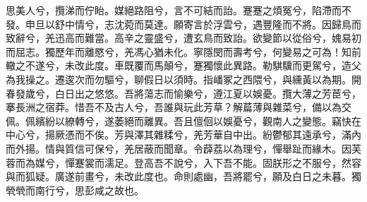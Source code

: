 
\begin{pinyinscope}
思美人兮，攬涕而佇眙。媒絕路阻兮，言不可結而詒。蹇蹇之煩冤兮，陷滯而不發。申旦以舒中情兮，志沈菀而莫達。願寄言於浮雲兮，遇豐隆而不將。因歸鳥而致辭兮，羌迅高而難當。高辛之靈盛兮，遭玄鳥而致詒。欲變節以從俗兮，媿易初而屈志。獨歷年而離愍兮，羌馮心猶未化。寧隱閔而壽考兮，何變易之可為！知前轍之不遂兮，未改此度。車既覆而馬顛兮，蹇獨懷此異路。勒騏驥而更駕兮，造父為我操之。遷逡次而勿驅兮，聊假日以須時。指嶓冢之西隈兮，與纁黃以為期。開春發歲兮，白日出之悠悠。吾將蕩志而愉樂兮，遵江夏以娛憂。攬大薄之芳茞兮，搴長洲之宿莽。惜吾不及古人兮，吾誰與玩此芳草？解萹薄與雜菜兮，備以為交佩。佩繽紛以繚轉兮，遂萎絕而離異。吾且儃佪以娛憂兮，觀南人之變態。竊快在中心兮，揚厥憑而不俟。芳與澤其雜糅兮，羌芳華自中出。紛鬱郁其遠承兮，滿內而外揚。情與質信可保兮，羌居蔽而聞章。令薜荔以為理兮，憚舉趾而緣木。因芙蓉而為媒兮，憚蹇裳而濡足。登高吾不說兮，入下吾不能。固朕形之不服兮，然容與而狐疑。廣遂前畫兮，未改此度也。命則處幽，吾將罷兮，願及白日之未暮。獨煢煢而南行兮，思彭咸之故也。


\end{pinyinscope}